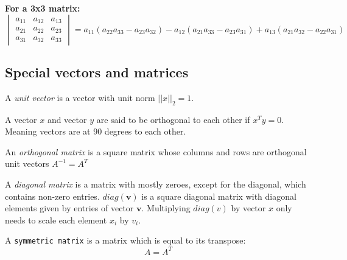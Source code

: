 \noindent
\textbf{For a 3x3 matrix:}
\[
	\begin{vmatrix}
		a_{11} & a_{12} & a_{13} \\
		a_{21} & a_{22} & a_{23} \\
		a_{31} & a_{32} & a_{33}
	\end{vmatrix}
	= a_{11}(a_{22}a_{33} - a_{23}a_{32}) - a_{12}(a_{21}a_{33} - a_{23}a_{31}) + a_{13}(a_{21}a_{32} - a_{22}a_{31})
\]

\subsection{Special vectors and matrices}%
\label{subsec:label}

A \textit{unit vector} is a vector with unit norm $||x||_{2}=1$.

A vector $x$ and vector $y$ are said to be orthogonal to each other if $x^{T}y=0$. Meaning vectors are at 90 degrees to each other.

An \textit{orthogonal matrix} is a square matrix whose columns and rows are orthogonal unit vectors $A^{-1} = A^{T}$

A \textit{diagonal matrix} is a matrix with mostly zeroes, except for the diagonal, which contains non-zero entries. $diag(\mathbf{v})$ is a square diagonal matrix with diagonal elements given by entries of vector $\mathbf{v}$. Multiplying $diag(v)$ by vector $x$ only needs to scale each element $x_{i}$ by $v_{i}$.

A \texttt{symmetric matrix} is a matrix which is equal to its transpose:
\[
	A = A^{T}
\]






